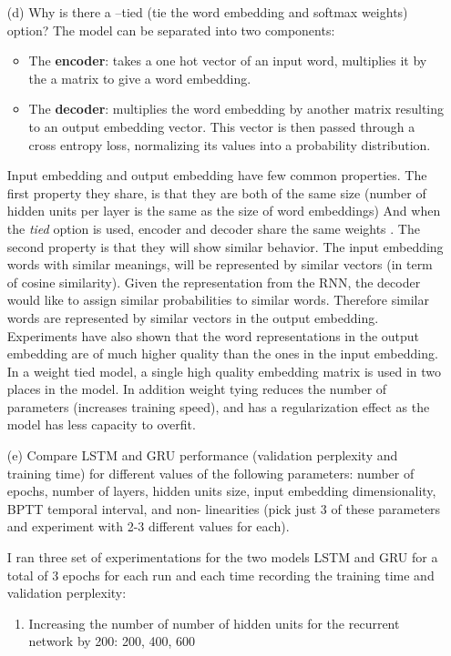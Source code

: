 \documentclass[11pt]{article}
\newcommand{\0}{\mat{0}}
\begin{document}
\begin{itemize}
     \item[(d)] 
    Why is there a --tied (tie the word embedding and softmax weights) option?
    The model can be separated into two components:
    \begin{itemize}
     \item The \textbf{encoder}: takes a one hot vector of an input word, multiplies it by the a matrix to give a word embedding. 
     \item The \textbf{decoder}: multiplies the word embedding by another matrix resulting to an output embedding vector. This vector is then passed through a cross entropy loss, normalizing its values into a probability distribution.
    \end{itemize}
    Input embedding and output embedding have few common properties. The first property they share, is that they are both of the same size (number of hidden units per layer is the same as the size of word embeddings) And when the \textit{tied} option is used, encoder and decoder share the same weights . The second property is that they will show similar behavior.
    The input embedding words with similar meanings, will be represented by similar vectors (in term of cosine similarity). Given the representation from the RNN, the decoder would like to assign similar probabilities to similar words.
    Therefore similar words are represented by similar vectors in the output embedding. Experiments have also shown that the word representations in the output embedding are of much higher quality than the ones in the input
    embedding. In a weight tied model, a single high quality embedding matrix is used in two places in the model. In addition weight tying reduces the number of parameters (increases training speed), and has a regularization effect
    as the model has less capacity to overfit.       
    
     \item[(e)] 
     Compare LSTM and GRU performance (validation perplexity and training time) for different values of the following parameters: number of epochs, number of layers, hidden units size, input embedding dimensionality, BPTT temporal interval, and non- linearities (pick just 3 of these parameters and experiment with 2-3 different values for each).
     
     I ran three set of experimentations for the two models LSTM and GRU for a total of 3 epochs for each run and each time recording the training time and validation perplexity:
     \begin{enumerate}
     	\item Increasing the number of number of hidden units for the recurrent network by 200: 200, 400, 600

\end{enumerate}
\end{itemize}
\end{document}
